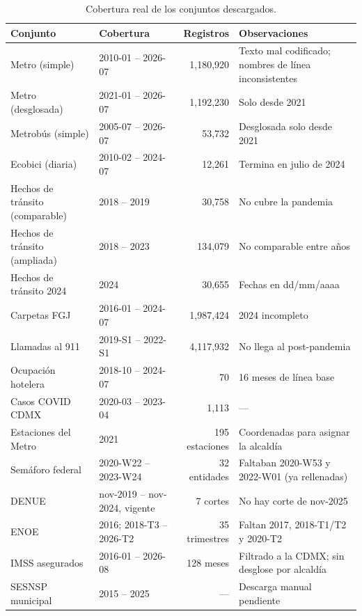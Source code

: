 {\small
\begin{longtable}{L{3.6cm}L{3.3cm}rL{5.2cm}}
\caption{Cobertura real de los conjuntos descargados.}\label{tab:cobertura}\\
\toprule
\textbf{Conjunto} & \textbf{Cobertura} & \textbf{Registros} & \textbf{Observaciones}\\
\midrule\endhead
Metro (simple) & 2010-01 -- 2026-07 & 1,180,920 & Texto mal codificado; nombres de línea inconsistentes\\
Metro (desglosada) & 2021-01 -- 2026-07 & 1,192,230 & Solo desde 2021\\
Metrobús (simple) & 2005-07 -- 2026-07 & 53,732 & Desglosada solo desde 2021\\
Ecobici (diaria) & 2010-02 -- 2024-07 & 12,261 & Termina en julio de 2024\\
Hechos de tránsito (comparable) & 2018 -- 2019 & 30,758 & No cubre la pandemia\\
Hechos de tránsito (ampliada) & 2018 -- 2023 & 134,079 & No comparable entre años\\
Hechos de tránsito 2024 & 2024 & 30,655 & Fechas en dd/mm/aaaa\\
Carpetas FGJ & 2016-01 -- 2024-07 & 1,987,424 & 2024 incompleto\\
Llamadas al 911 & 2019-S1 -- 2022-S1 & 4,117,932 & No llega al post-pandemia\\
Ocupación hotelera & 2018-10 -- 2024-07 & 70 & 16 meses de línea base\\
Casos COVID CDMX & 2020-03 -- 2023-04 & 1,113 & ---\\
Estaciones del Metro & 2021 & 195 estaciones & Coordenadas para asignar la alcaldía\\
Semáforo federal & 2020-W22 -- 2023-W24 & 32 entidades & Faltaban 2020-W53 y 2022-W01 (ya rellenadas)\\
DENUE & nov-2019 -- nov-2024, vigente & 7 cortes & No hay corte de nov-2025\\
ENOE & 2016; 2018-T3 -- 2026-T2 & 35 trimestres & Faltan 2017, 2018-T1/T2 y 2020-T2\\
IMSS asegurados & 2016-01 -- 2026-08 & 128 meses & Filtrado a la CDMX; sin desglose por alcaldía\\
SESNSP municipal & 2015 -- 2025 & --- & Descarga manual pendiente\\
\bottomrule
\end{longtable}}

